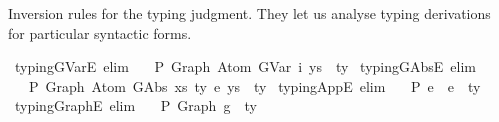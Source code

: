 \begin{isabellebody}
\begin{isamarkuptext}%
Inversion rules for the typing judgment.
  They let us analyse typing derivations for particular syntactic forms.%
\end{isamarkuptext}\isamarkuptrue%
\isamarkupfalse%
\ typing{\isacharunderscore}{\kern0pt}GVarE\ {\isacharbrackleft}{\kern0pt}elim{\isacharbang}{\kern0pt}{\isacharbrackright}{\kern0pt}{\isacharcolon}{\kern0pt}\isanewline
\ \ {\isachardoublequoteopen}{\isasymGamma}\ {\isasymturnstile}{\isacharbraceleft}{\kern0pt}P{\isacharbraceright}{\kern0pt}\ Graph\ {\isacharparenleft}{\kern0pt}Atom\ {\isacharparenleft}{\kern0pt}GVar\ i{\isacharparenright}{\kern0pt}\ ys{\isacharparenright}{\kern0pt}\ {\isacharcolon}{\kern0pt}\ ty{\isachardoublequoteclose}\isanewline
\isanewline
{}\isamarkupfalse%
\ typing{\isacharunderscore}{\kern0pt}GAbsE\ {\isacharbrackleft}{\kern0pt}elim{\isacharbang}{\kern0pt}{\isacharbrackright}{\kern0pt}{\isacharcolon}{\kern0pt}\isanewline
\ \ {\isachardoublequoteopen}{\isasymGamma}\ {\isasymturnstile}{\isacharbraceleft}{\kern0pt}P{\isacharbraceright}{\kern0pt}\ Graph\ {\isacharparenleft}{\kern0pt}Atom\ {\isacharparenleft}{\kern0pt}GAbs\ xs\ ty{}\ e{\isacharparenright}{\kern0pt}\ ys{\isacharparenright}{\kern0pt}\ {\isacharcolon}{\kern0pt}\ ty{\isachardoublequoteclose}\isanewline
\isanewline
{}\isamarkupfalse%
\ typing{\isacharunderscore}{\kern0pt}AppE\ {\isacharbrackleft}{\kern0pt}elim{\isacharbang}{\kern0pt}{\isacharbrackright}{\kern0pt}{\isacharcolon}{\kern0pt}\isanewline
\ \ {\isachardoublequoteopen}{\isasymGamma}\ {\isasymturnstile}{\isacharbraceleft}{\kern0pt}P{\isacharbraceright}{\kern0pt}\ e{}\ {\isasymcdot}\ e{}\ {\isacharcolon}{\kern0pt}\ ty{\isachardoublequoteclose}\isanewline
\isanewline
{}\isamarkupfalse%
\ typing{\isacharunderscore}{\kern0pt}GraphE\ {\isacharbrackleft}{\kern0pt}elim{\isacharbang}{\kern0pt}{\isacharbrackright}{\kern0pt}{\isacharcolon}{\kern0pt}\isanewline
\ \ {\isachardoublequoteopen}{\isasymGamma}\ {\isasymturnstile}{\isacharbraceleft}{\kern0pt}P{\isacharbraceright}{\kern0pt}\ {\isacharparenleft}{\kern0pt}Graph\ g{\isacharparenright}{\kern0pt}\ {\isacharcolon}{\kern0pt}\ ty{\isachardoublequoteclose}%
\isadelimdocument
%
\endisadelimdocument
%
\isatagdocument
%
\isamarkuptrue%
%
\endisatagdocument

\end{isabellebody}
